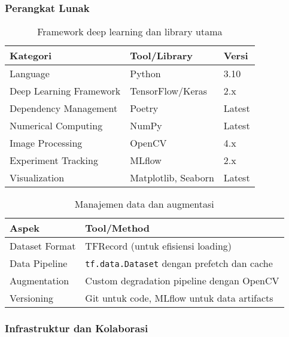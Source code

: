 \documentclass[12pt,a4paper]{article}
\begin{document}
\subsubsection{Perangkat Lunak}
\label{subsubsec:software}

\begin{table}[H]
\centering
\caption{Framework deep learning dan library utama}
\label{tab:software-framework}
\small
\begin{tabular}{|l|l|l|}
\hline
\textbf{Kategori} & \textbf{Tool/Library} & \textbf{Versi} \\ \hline
Language & Python & 3.10 \\ \hline
Deep Learning Framework & TensorFlow/Keras & 2.x \\ \hline
Dependency Management & Poetry & Latest \\ \hline
Numerical Computing & NumPy & Latest \\ \hline
Image Processing & OpenCV & 4.x \\ \hline
Experiment Tracking & MLflow & 2.x \\ \hline
Visualization & Matplotlib, Seaborn & Latest \\ \hline
\end{tabular}
\end{table}

\begin{table}[H]
\centering
\caption{Manajemen data dan augmentasi}
\label{tab:data-management}
\small
\begin{tabular}{|l|l|}
\hline
\textbf{Aspek} & \textbf{Tool/Method} \\ \hline
Dataset Format & TFRecord (untuk efisiensi loading) \\ \hline
Data Pipeline & \texttt{tf.data.Dataset} dengan prefetch dan cache \\ \hline
Augmentation & Custom degradation pipeline dengan OpenCV \\ \hline
Versioning & Git untuk code, MLflow untuk data artifacts \\ \hline
\end{tabular}
\end{table}

\subsubsection{Infrastruktur dan Kolaborasi}
\label{subsubsec:infrastructure}
\end{document}
